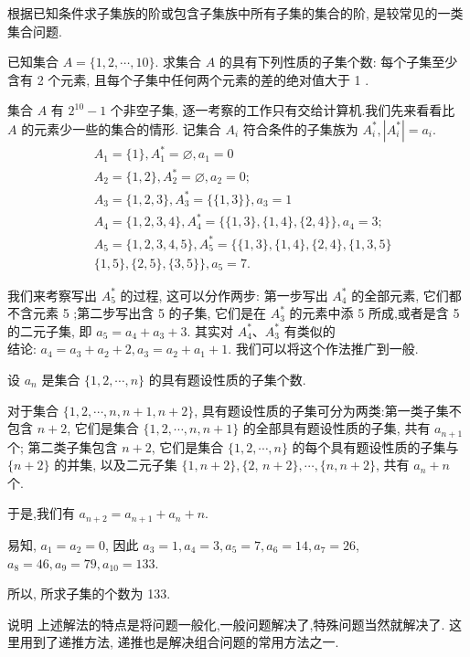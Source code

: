 根据已知条件求子集族的阶或包含子集族中所有子集的集合的阶, 是较常见的一类集合问题.

\begin{example}
	已知集合 $A=\{1,2, \cdots, 10\}$. 求集合 $A$ 的具有下列性质的子集个数: 每个子集至少含有 2 个元素, 且每个子集中任何两个元素的差的绝对值大于 1 .
\end{example}

\begin{analysis}
	集合 $A$ 有 $2^{10}-1$ 个非空子集, 逐一考察的工作只有交给计算机.我们先来看看比 $A$ 的元素少一些的集合的情形. 记集合 $A_{i}$ 符合条件的子集族为 $A_{i}^{*}, \left|A_{i}^{*}\right|=a_{i}$.
	$$
		\begin{aligned}
			 & A_{1}=\{1\}, A_{1}^{*}=\varnothing, a_{1}=0                         \\
			 & A_{2}=\{1,2\}, A_{2}^{*}=\varnothing, a_{2}=0 ;                     \\
			 & A_{3}=\{1,2,3\}, A_{3}^{*}=\{\{1,3\}\}, a_{3}=1                     \\
			 & A_{4}=\{1,2,3,4\}, A_{4}^{*}=\{\{1,3\},\{1,4\},\{2,4\}\}, a_{4}=3 ; \\
			 & A_{5}=\{1,2,3,4,5\}, A_{5}^{*}=\{\{1,3\},\{1,4\},\{2,4\},\{1,3,5\}  \\
			 & \{1,5\},\{2,5\},\{3,5\}\}, a_{5}=7 .
		\end{aligned}
	$$

	我们来考察写出 $A_{5}^{*}$ 的过程, 这可以分作两步: 第一步写出 $A_{4}^{*}$ 的全部元素, 它们都不含元素 5 ;第二步写出含 5 的子集, 它们是在 $A_{3}^{*}$ 的元素中添 5 所成,或者是含 5 的二元子集, 即 $a_{5}=a_{4}+a_{3}+3$. 其实对 $A_{4}^{*} 、 A_{3}^{*}$ 有类似的\\
	结论: $a_{4}=a_{3}+a_{2}+2, a_{3}=a_{2}+a_{1}+1$. 我们可以将这个作法推广到一般.
\end{analysis}

\begin{solution}
	设 $a_{n}$ 是集合 $\{1,2, \cdots, n\}$ 的具有题设性质的子集个数.

	对于集合 $\{1,2, \cdots, n, n+1, n+2\}$, 具有题设性质的子集可分为两类:第一类子集不包含 $n+2$, 它们是集合 $\{1,2, \cdots, n, n+1\}$ 的全部具有题设性质的子集, 共有 $a_{n+1}$ 个; 第二类子集包含 $n+2$, 它们是集合 $\{1,2, \cdots, n\}$ 的每个具有题设性质的子集与 $\{n+2\}$ 的并集, 以及二元子集 $\{1, n+2\},\{2$, $n+2\}, \cdots,\{n, n+2\}$, 共有 $a_{n}+n$ 个.

	于是,我们有 $a_{n+2}=a_{n+1}+a_{n}+n$.

	易知, $a_{1}=a_{2}=0$, 因此 $a_{3}=1, a_{4}=3, a_{5}=7, a_{6}=14, a_{7}=26$, $a_{8}=46, a_{9}=79, a_{10}=133$.

	所以, 所求子集的个数为 133.
\end{solution}
\begin{note}
	说明 上述解法的特点是将问题一般化,一般问题解决了,特殊问题当然就解决了. 这里用到了递推方法, 递推也是解决组合问题的常用方法之一.
\end{note}

